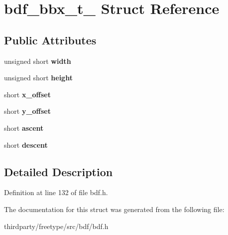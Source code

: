 \hypertarget{structbdf__bbx__t__}{}\section{bdf\+\_\+bbx\+\_\+t\+\_\+ Struct Reference}
\label{structbdf__bbx__t__}
\subsection*{Public Attributes}
\begin{DoxyCompactItemize}
\item 
\mbox{\label{structbdf__bbx__t___a42cb590403cf4abaca1398c64adac19e}} 
unsigned short {\bfseries width}
\item 
\mbox{\label{structbdf__bbx__t___abcf60c0bccd7ee6594de7c75ddcdaf66}} 
unsigned short {\bfseries height}
\item 
\mbox{\label{structbdf__bbx__t___a026adf2cc939912e1f7849bab3588bc4}} 
short {\bfseries x\+\_\+offset}
\item 
\mbox{\label{structbdf__bbx__t___a71a5b7f55dbeff54136c6913bb99ee1e}} 
short {\bfseries y\+\_\+offset}
\item 
\mbox{\label{structbdf__bbx__t___a9a2715ab117e23138ded56d01d1ef434}} 
short {\bfseries ascent}
\item 
\mbox{\label{structbdf__bbx__t___ad3b351b7ddb9cd4500edb451412468f8}} 
short {\bfseries descent}
\end{DoxyCompactItemize}


\subsection{Detailed Description}


Definition at line 132 of file bdf.\+h.



The documentation for this struct was generated from the following file\+:\begin{DoxyCompactItemize}
\item 
thirdparty/freetype/src/bdf/bdf.\+h\end{DoxyCompactItemize}
